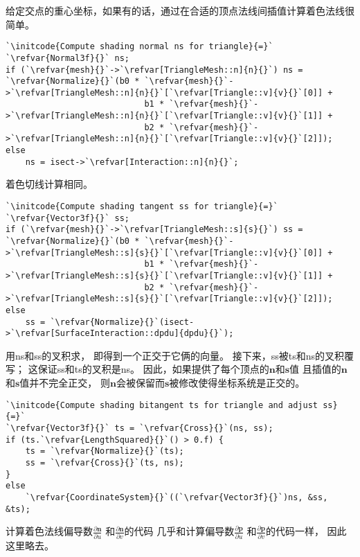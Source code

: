 给定交点的重心坐标，如果有的话，通过在合适的顶点法线间插值计算着色法线很简单。
\begin{lstlisting}
`\initcode{Compute shading normal ns for triangle}{=}`
`\refvar{Normal3f}{}` ns;
if (`\refvar{mesh}{}`->`\refvar[TriangleMesh::n]{n}{}`) ns = `\refvar{Normalize}{}`(b0 * `\refvar{mesh}{}`->`\refvar[TriangleMesh::n]{n}{}`[`\refvar[Triangle::v]{v}{}`[0]] +
                            b1 * `\refvar{mesh}{}`->`\refvar[TriangleMesh::n]{n}{}`[`\refvar[Triangle::v]{v}{}`[1]] + 
                            b2 * `\refvar{mesh}{}`->`\refvar[TriangleMesh::n]{n}{}`[`\refvar[Triangle::v]{v}{}`[2]]);
else
    ns = isect->`\refvar[Interaction::n]{n}{}`;
\end{lstlisting}

着色切线计算相同。
\begin{lstlisting}
`\initcode{Compute shading tangent ss for triangle}{=}`
`\refvar{Vector3f}{}` ss;
if (`\refvar{mesh}{}`->`\refvar[TriangleMesh::s]{s}{}`) ss = `\refvar{Normalize}{}`(b0 * `\refvar{mesh}{}`->`\refvar[TriangleMesh::s]{s}{}`[`\refvar[Triangle::v]{v}{}`[0]] +
                            b1 * `\refvar{mesh}{}`->`\refvar[TriangleMesh::s]{s}{}`[`\refvar[Triangle::v]{v}{}`[1]] + 
                            b2 * `\refvar{mesh}{}`->`\refvar[TriangleMesh::s]{s}{}`[`\refvar[Triangle::v]{v}{}`[2]]);
else
    ss = `\refvar{Normalize}{}`(isect->`\refvar[SurfaceInteraction::dpdu]{dpdu}{}`);
\end{lstlisting}

用{\ttfamily ns}和{\ttfamily ss}的叉积求，
即得到一个正交于它俩的向量。
接下来，{\ttfamily ss}被{\ttfamily ts}和{\ttfamily ns}的叉积覆写；
这保证{\ttfamily ss}和{\ttfamily ts}的叉积是{\ttfamily ns}。
因此，如果提供了每个顶点的$\bm n$和$\bm s$值
且插值的$\bm n$和$\bm s$值并不完全正交，
则$\bm n$会被保留而$\bm s$被修改使得坐标系统是正交的。
\begin{lstlisting}
`\initcode{Compute shading bitangent ts for triangle and adjust ss}{=}`
`\refvar{Vector3f}{}` ts = `\refvar{Cross}{}`(ns, ss);
if (ts.`\refvar{LengthSquared}{}`() > 0.f) {
    ts = `\refvar{Normalize}{}`(ts);
    ss = `\refvar{Cross}{}`(ts, ns);
}
else
    `\refvar{CoordinateSystem}{}`((`\refvar{Vector3f}{}`)ns, &ss, &ts);
\end{lstlisting}

计算着色法线偏导数$\displaystyle\frac{\partial\bm n}{\partial u}$
和$\displaystyle\frac{\partial\bm n}{\partial v}$的代码
几乎和计算偏导数$\displaystyle\frac{\partial\bm p}{\partial u}$
和$\displaystyle\frac{\partial\bm p}{\partial v}$的代码一样，
因此这里略去。

